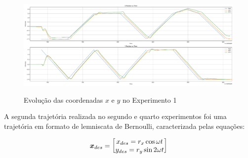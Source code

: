 
\begin{figure}[htb]
    \centering
    \caption{Evolução das coordenadas $x$ e $y$ no Experimento 1}
    \includegraphics[width=\linewidth]{img/Resultados/Exp1_VRPN_Control_LINEAR/Position_v_time.pdf}
    \sourceParbox[\linewidth]
    \label{fig:Exp1_XY_vs_tempo}
\end{figure}


%     

A segunda trajetória realizada no segundo e quarto experimentos foi uma trajetória em formato de lemniscata de Bernoulli, caracterizada pelas equações:

\begin{equation}
\label{eq:lemniscata}
    \boldsymbol{x}_{des}=\begin{bmatrix} x_{des}=r_x\cos{\omega t} \\ y_{des}=r_y\sin{2 \omega t} \end{bmatrix}
\end{equation}

